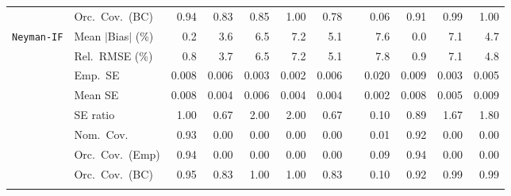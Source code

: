 \begin{landscape}
\begin{longtable}{llrrrrrrrrrr}
 & Orc.\ Cov.\ (BC) & \cellcolor{rankone}0.94 & 0.83 & 0.85 & 1.00 & 0.78 &  & 0.06 & \cellcolor{rankthree}0.91 & \cellcolor{ranktwo}0.99 & 1.00 \\
\addlinespace[2pt]
\quad \texttt{Neyman-IF} & Mean $|$Bias$|$ (\%) & \cellcolor{ranktwo}0.2 & \cellcolor{rankthree}3.6 & 6.5 & 7.2 & 5.1 &  & 7.6 & \cellcolor{rankone}0.0 & 7.1 & 4.7 \\
 & Rel.\ RMSE (\%) & \cellcolor{rankone}0.8 & \cellcolor{rankthree}3.7 & 6.5 & 7.2 & 5.1 &  & 7.8 & \cellcolor{ranktwo}0.9 & 7.1 & 4.8 \\
 & Emp.\ SE & 0.008 & 0.006 & 0.003 & 0.002 & 0.006 &  & 0.020 & 0.009 & 0.003 & 0.005 \\
 & Mean SE & 0.008 & 0.004 & 0.006 & 0.004 & 0.004 &  & 0.002 & 0.008 & 0.005 & 0.009 \\
 & SE ratio & \cellcolor{rankone}1.00 & \cellcolor{rankthree}0.67 & 2.00 & 2.00 & 0.67 &  & 0.10 & \cellcolor{ranktwo}0.89 & 1.67 & 1.80 \\
 & Nom.\ Cov. & \cellcolor{rankone}0.93 & 0.00 & 0.00 & 0.00 & 0.00 &  & \cellcolor{rankthree}0.01 & \cellcolor{ranktwo}0.92 & 0.00 & 0.00 \\
 & Orc.\ Cov.\ (Emp) & \cellcolor{ranktwo}0.94 & 0.00 & 0.00 & 0.00 & 0.00 &  & \cellcolor{rankthree}0.09 & \cellcolor{rankone}0.94 & 0.00 & 0.00 \\
 & Orc.\ Cov.\ (BC) & \cellcolor{rankone}0.95 & 0.83 & 1.00 & 1.00 & 0.83 &  & 0.10 & \cellcolor{ranktwo}0.92 & \cellcolor{rankthree}0.99 & 0.99 \\
\addlinespace[2pt]
\end{longtable}
\end{landscape}

